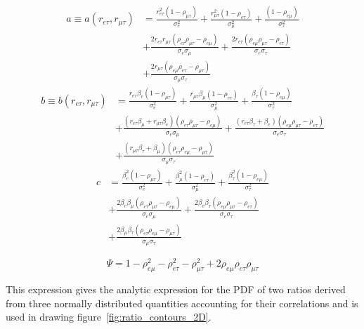 \begin{align} 
    a \equiv a\left(r_{e\tau}, r_{\mu\tau}\right) 
            &= \frac{r_{e\tau}^{2}\left(1 - \rho_{\mu\tau} \right)}{\sigma_{e}^{2}}
            + \frac{r_{\mu\tau}^{2}\left(1 - \rho_{e\tau} \right)}{\sigma_{\mu}^{2}}
            + \frac{\left(1 - \rho_{e\mu} \right)}{\sigma_{\tau}^{2}} \\
            \nonumber
            &+ \frac{2r_{e\tau}r_{\mu\tau}\left( \rho_{e\tau} \rho_{\mu\tau}   - \rho_{e\mu} \right)}{\sigma_{e}\sigma_{\mu}} 
            \nonumber
            + \frac{2r_{e\tau}\left( \rho_{e\mu} \rho_{\mu\tau}   - \rho_{e\tau} \right)}{\sigma_{e}\sigma_{\tau}} \\
            \nonumber
            &+ \frac{2r_{\mu\tau}\left( \rho_{e\mu} \rho_{e\tau}   - \rho_{\mu\tau} \right)}{\sigma_{\mu}\sigma_{\tau}}
\end{align}
\begin{align}
    b \equiv b(r_{e\tau}, r_{\mu\tau}) 
        &= \frac{r_{e\tau}\beta_{e}\left(1 - \rho_{\mu\tau} \right)}{\sigma_{e}^{2}}
        + \frac{r_{\mu\tau}\beta_{\mu}\left(1 - \rho_{e\tau} \right)}{\sigma_{\mu}^{2}}
        + \frac{\beta_{\tau}\left(1 - \rho_{e\mu} \right)}{\sigma_{\tau}^{2}} \\
        \nonumber
        &+ \frac{\left(r_{e\tau}\beta_{\mu} + r_{\mu\tau}\beta_{e}\right)\left( \rho_{e\tau} \rho_{\mu\tau} - \rho_{e\mu} \right)}{\sigma_{e}\sigma_{\mu}}
        \nonumber
        + \frac{\left(r_{e\tau}\beta_{\tau} + \beta_{e}\right)\left( \rho_{e\mu} \rho_{\mu\tau}   - \rho_{e\tau} \right)}{\sigma_{e}\sigma_{\tau}} \\ 
        \nonumber
        &+ \frac{\left(r_{\mu\tau}\beta_{\tau} + \beta_{\mu}\right)\left( \rho_{e\tau} \rho_{e\mu}   - \rho_{\mu\tau} \right)}{\sigma_{\mu}\sigma_{\tau}}
\end{align}
\begin{align}
    c &= \frac{\beta_{e}^{2}\left(1 - \rho_{\mu\tau} \right)}{\sigma_{e}^{2}}
    + \frac{\beta_{\mu}^{2}\left(1 - \rho_{e\tau} \right)}{\sigma_{\mu}^{2}}
    + \frac{\beta_{\tau}^{2}\left(1 - \rho_{e\mu} \right)}{\sigma_{\tau}^{2}} \\
        \nonumber
        &+ \frac{2\beta_{e}\beta_{\mu}\left( \rho_{e\tau} \rho_{\mu\tau} - \rho_{e\mu} \right)}{\sigma_{e}\sigma_{\mu}}
        \nonumber
        + \frac{2\beta_{e}\beta_{\tau}\left( \rho_{e\mu} \rho_{\mu\tau}   - \rho_{e\tau} \right)}{\sigma_{e}\sigma_{\tau}} \\ 
        \nonumber
        &+ \frac{2\beta_{\mu}\beta_{\tau}\left( \rho_{e\tau} \rho_{e\mu}   - \rho_{\mu\tau} \right)}{\sigma_{\mu}\sigma_{\tau}}
\end{align}

\begin{equation}
    \Psi = 1 - \rho_{e\mu}^{2} - \rho_{e\tau}^{2} - \rho_{\mu\tau}^{2} + 2\rho_{e\mu}\rho_{e\tau}\rho_{\mu\tau}
\end{equation}

This expression gives the analytic expression for the PDF of two ratios
derived from three normally distributed quantities accounting for their
correlations and is used in drawing figure~\ref{fig:ratio_contours_2D}.
\FloatBarrier